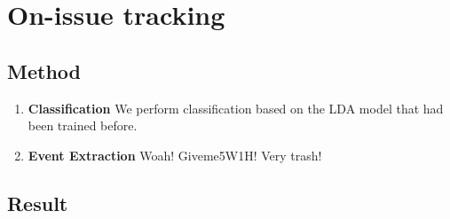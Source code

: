 \section{On-issue tracking}

\subsection{Method}

\begin{enumerate}
  \item \textbf{Classification}
    We perform classification based on the LDA model that had been trained before.
  \item \textbf{Event Extraction}
    Woah! Giveme5W1H! Very trash!
\end{enumerate}

\subsection{Result}
